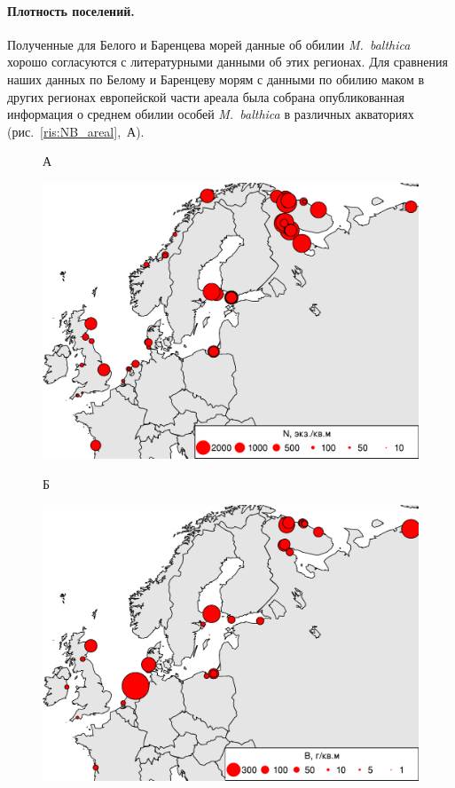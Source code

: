 {\paragraph{Плотность поселений.}
Полученные для Белого и Баренцева морей данные об обилии \textit{M.~balthica} хорошо согласуются с литературными данными об этих регионах.
Для сравнения наших данных по Белому и Баренцеву морям с данными по обилию маком в других регионах европейской части ареала была собрана опубликованная информация о среднем обилии особей {\it M.~balthica} в различных акваториях (рис.~\ref{ris:NB_areal},~А).
	\begin{figure}[]
		\begin{minipage}[b]{.5\linewidth}
			{\small А}
			\begin{center}
			    \includegraphics[width=\textwidth]{../macrodistribution/Nmean_ru1.pdf}
			\end{center}
		\end{minipage}
	\hfil %
		\begin{minipage}[b]{.5\linewidth}
			{\small Б}
			\begin{center}
				\includegraphics[width=\textwidth]{../macrodistribution/Bmean_ru1.pdf}

\end{center}
\end{minipage}
\end{figure}}
